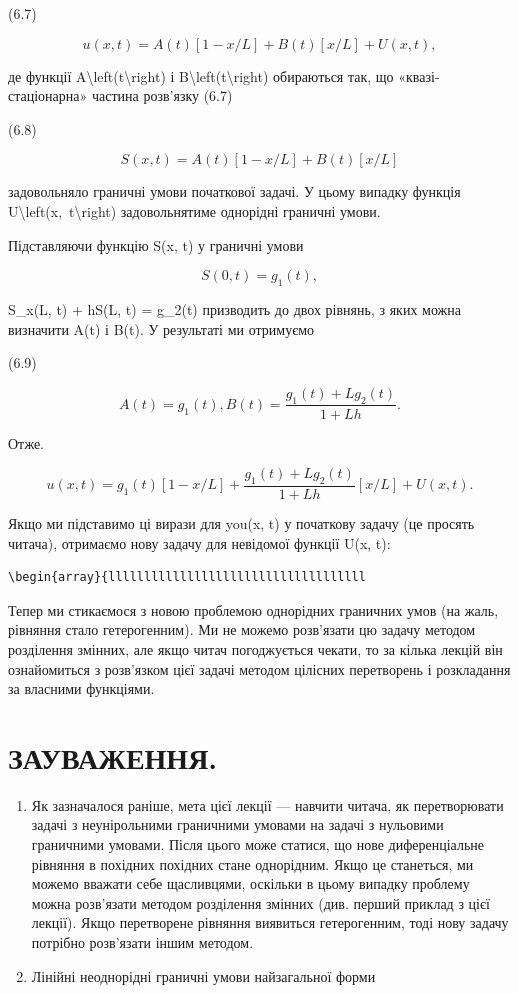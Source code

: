 \documentclass[
]{article}
\begin{document}
(6.7)

\[
u(x, t) = A(t)[1-x/L] + B(t)[x/L] + U(x, t),
\]

де функції A\textbackslash left(t\textbackslash right) і
B\textbackslash left(t\textbackslash right) обираються так, що
«квазі-стаціонарна» частина розв'язку (6.7)

(6.8)

\[
S(x, t) = A(t)[1 - x/L] + B(t)[x/L]
\]

задовольняло граничні умови початкової задачі. У цьому випадку функція
U\textbackslash left(x,~t\textbackslash right) задовольнятиме однорідні
граничні умови.

Підставляючи функцію S(x, t) у граничні умови

\[
S(0, t) = g_1(t),
\]

S\_x(L, t) + hS(L, t) = g\_2(t) призводить до двох рівнянь, з яких можна
визначити A(t) і B(t). У результаті ми отримуємо

(6.9)

\[
A(t) = g_1(t), B(t) = \frac{g_1(t) + Lg_2(t)}{1 + Lh}.
\]

Отже.

\[
u(x, t) = g_1(t) [1 - x/L] + \frac{g_1(t) + Lg_2(t)}{1 + Lh} [x/L] + U(x, t).
\]

Якщо ми підставимо ці вирази для you(x, t) у початкову задачу (це
просять читача), отримаємо нову задачу для невідомої функції U(x, t):

\begin{verbatim}
\begin{array}{llllllllllllllllllllllllllllllllllll
\end{verbatim}

Тепер ми стикаємося з новою проблемою однорідних граничних умов (на
жаль, рівняння стало гетерогенним). Ми не можемо розв'язати цю задачу
методом розділення змінних, але якщо читач погоджується чекати, то за
кілька лекцій він ознайомиться з розв'язком цієї задачі методом цілісних
перетворень і розкладання за власними функціями.

\section{ЗАУВАЖЕННЯ.}\label{ux437ux430ux443ux432ux430ux436ux435ux43dux43dux44f.}

\begin{enumerate}
\def\labelenumi{\arabic{enumi}.}
\item
  Як зазначалося раніше, мета цієї лекції --- навчити читача, як
  перетворювати задачі з неунірольними граничними умовами на задачі з
  нульовими граничними умовами. Після цього може статися, що нове
  диференціальне рівняння в похідних похідних стане однорідним. Якщо це
  станеться, ми можемо вважати себе щасливцями, оскільки в цьому випадку
  проблему можна розв'язати методом розділення змінних (див. перший
  приклад з цієї лекції). Якщо перетворене рівняння виявиться
  гетерогенним, тоді нову задачу потрібно розв'язати іншим методом.
\item
  Лінійні неоднорідні граничні умови найзагальної форми
\end{enumerate}
\end{document}
